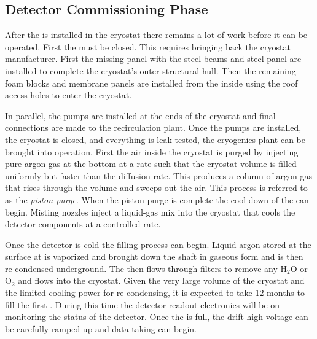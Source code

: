 \clearpage

\subsection{Detector Commissioning Phase}
\label{sec:fdsp-tc-inst-comiss}
After the  is installed in the cryostat there remains a lot of work before it can be operated. 
First the  must be closed. 
This requires bringing back the cryostat manufacturer. 
First the missing panel with the steel beams and steel panel are installed to complete the cryostat's outer structural hull. 
Then the remaining foam blocks and membrane panels
are installed from the inside using the roof access holes 
to enter the cryostat. 

In parallel, the \lar pumps are installed at the ends of the cryostat and final connections are made to the recirculation plant. 
Once the pumps are installed, the cryostat is closed, and everything is leak tested, the cryogenics plant can be brought into operation. 
First the air inside the cryostat is purged by injecting pure argon gas at the bottom  at a rate such that the cryostat volume is filled uniformly but faster than the diffusion
rate. 
This produces a column of argon gas that rises through the volume and sweeps out the air. 
This process is referred to as the \textit{piston purge}. 
When the piston purge is complete the cool-down of the  can begin. 
Misting nozzles inject a liquid-gas mix into the cryostat
that cools the detector components at a controlled rate. 

Once the detector is cold the filling process can begin. 
Liquid argon stored at the surface  at \surf is vaporized and brought down the shaft in gaseous form and is then re-condensed underground. 
The \lar then flows through filters to remove any H$_2$O or O$_2$ and flows into the cryostat.
Given the very large volume of the cryostat and the limited cooling power for re-condensing, it is  expected to take \num{12} months to fill the first . 
During this time the detector readout electronics will be on monitoring the status of the detector. 
Once the  is full, the drift high voltage can be carefully ramped up and data taking can begin.


























